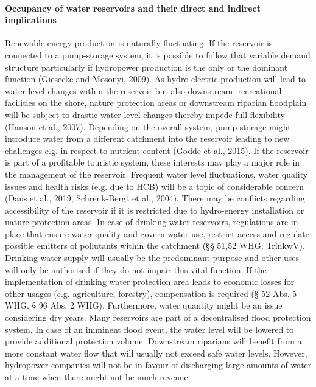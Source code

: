 \paragraph {Occupancy of water reservoirs and their direct and indirect implications}
Renewable energy production is naturally fluctuating. If the reservoir is connected to a pump-storage system, it is possible to follow that variable demand structure particularly if hydropower production is the only or the dominant function (Giesecke and Mosonyi, 2009). As hydro electric production will lead to water level changes within the reservoir but also downstream, recreational facilities on the shore, nature protection areas or downstream riparian floodplain will be subject to drastic water level changes thereby impede full flexibility (Hanson et al., 2007). Depending on the overall system, pump storage might introduce water from a different catchment into the reservoir leading to new challenges e.g. in respect to nutrient content (Godde et al., 2015).
If the reservoir is part of a profitable touristic system, these interests may play a major role in the management of the reservoir. Frequent water level fluctuations, water quality issues and health risks (e.g. due to HCB) will be a topic of considerable concern (Daus et al., 2019; Schrenk-Bergt et al., 2004). There may be conflicts regarding accessibility of the reservoir if it is restricted due to hydro-energy installation or nature protection areas. 
In case of drinking water reservoirs, regulations are in place that ensure water quality and govern water use, restrict access and regulate possible emitters of pollutants within the catchment (§§ 51,52 WHG; TrinkwV). Drinking water supply will usually be the predominant purpose and other uses will only be authorised if they do not impair this vital function. If the implementation of drinking water protection area leads to economic losses for other usages (e.g. agriculture, forestry), compensation is required (§ 52 Abs. 5 WHG, § 96 Abs. 2 WHG). Furthermore, water quantity might be an issue considering dry years.
Many reservoirs are part of a decentralised flood protection system. In case of an imminent flood event, the water level will be lowered to provide additional protection volume. Downstream riparians will benefit from a more constant water flow that will usually not exceed safe water levels. However, hydropower companies will not be in favour of discharging large amounts of water at a time when there might not be much revenue. 
